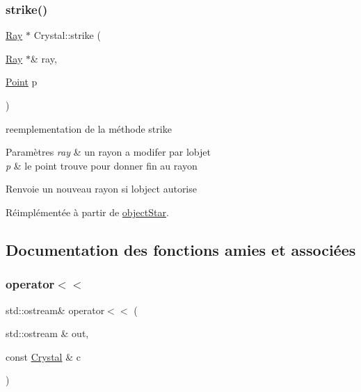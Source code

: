 \subsubsection{\texorpdfstring{strike()}{strike()}}
{\footnotesize\ttfamily \mbox{\hyperlink{class_ray}{Ray}} $\ast$ Crystal\+::strike (\begin{DoxyParamCaption}\item[{\mbox{\hyperlink{class_ray}{Ray}} $\ast$\&}]{ray,  }\item[{\mbox{\hyperlink{class_point}{Point}}}]{p }\end{DoxyParamCaption})\hspace{0.3cm}{\ttfamily [virtual]}}

reemplementation de la méthode strike 
\begin{DoxyParams}{Paramètres}
{\em ray} & un rayon a modifer par l\textquotesingle{}objet \\
\hline
{\em p} & le point trouve pour donner fin au rayon \\
\hline
\end{DoxyParams}
\begin{DoxyReturn}{Renvoie}
un nouveau rayon si l\textquotesingle{}object autorise 
\end{DoxyReturn}


Réimplémentée à partir de \mbox{\hyperlink{classobject_star_a5155713af07f8397057706a1eeb843ed}{object\+Star}}.



\subsection{Documentation des fonctions amies et associées}
\mbox{\label{class_crystal_a45da91e3993e90a57a5f4fd5edda0adb}} 
\subsubsection{\texorpdfstring{operator$<$$<$}{operator<<}}
{\footnotesize\ttfamily std\+::ostream\& operator$<$$<$ (\begin{DoxyParamCaption}\item[{std\+::ostream \&}]{out,  }\item[{const \mbox{\hyperlink{class_crystal}{Crystal}} \&}]{c }\end{DoxyParamCaption})\hspace{0.3cm}{\ttfamily [friend]}}

